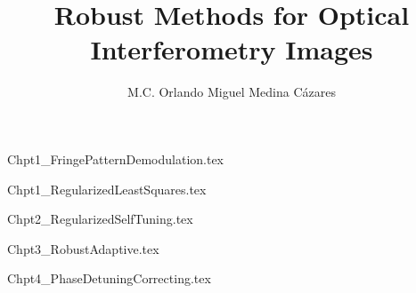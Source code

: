 \message{ !name(PhdThesis.tex)}\documentclass[letterpaper,12pt]{book}
\title{Robust Methods for Optical Interferometry Images}
\author{M.C. Orlando Miguel Medina C\'azares}
\begin{document}


\maketitle

\clearpage
\thispagestyle{empty}

\tableofcontents
{}
\listoffigures

\mainmatter
{Chpt1_FringePatternDemodulation.tex}

{Chpt1_RegularizedLeastSquares.tex}

{Chpt2_RegularizedSelfTuning.tex}

{Chpt3_RobustAdaptive.tex}

{Chpt4_PhaseDetuningCorrecting.tex}


\medskip

\end{document}
